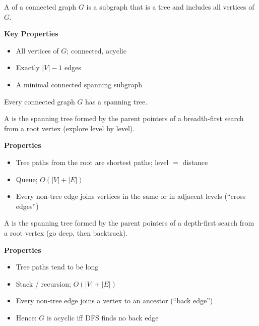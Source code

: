 \documentclass[8pt,a4paper,landscape]{extarticle}
\begin{document}
\begin{cscolumns}
\begin{definition}
A  of a connected graph $G$ is a subgraph that is a tree and includes all vertices of $G$.
\end{definition}
\textbf{Key Properties}
\begin{itemize}
\item All vertices of $G$; connected, acyclic
\item Exactly $|V|-1$ edges
\item A minimal connected spanning subgraph
\end{itemize}
\begin{theorem}
Every connected graph $G$ has a spanning tree.
\end{theorem}
\begin{definition}
A  is the spanning tree formed by the parent pointers of a breadth-first search from a root vertex (explore level by level).
\end{definition}
\textbf{Properties}
\begin{itemize}
\item Tree paths from the root are shortest paths; level $=$ distance
\item Queue; $O(|V|+|E|)$
\item Every non-tree edge joins vertices in the same or in adjacent levels (``cross edges'')
\end{itemize}
\begin{definition}
A  is the spanning tree formed by the parent pointers of a depth-first search from a root vertex (go deep, then backtrack).
\end{definition}
\textbf{Properties}
\begin{itemize}
\item Tree paths tend to be long
\item Stack / recursion; $O(|V|+|E|)$
\item Every non-tree edge joins a vertex to an ancestor (``back edge'')
\item Hence: $G$ is acyclic iff DFS finds no back edge
\end{itemize}


\end{cscolumns}
\newpage
\end{document}
